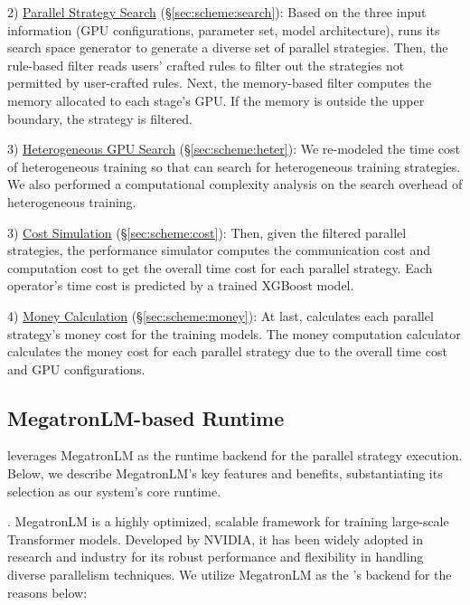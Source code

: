 2) \underline{Parallel Strategy Search} (\S\ref{sec:scheme:search}): Based on the three input information (GPU configurations, parameter set, model architecture), \sysname runs its search space generator to generate a diverse set of parallel strategies.
Then, the rule-based filter reads users' crafted rules to filter out the strategies not permitted by user-crafted rules.
Next, the memory-based filter computes the memory allocated to each stage's GPU. If the memory is outside the upper boundary, the strategy is filtered.

3) \underline{Heterogeneous GPU Search} (\S\ref{sec:scheme:heter}):
We re-modeled the time cost of heterogeneous training so that \sysname can search for heterogeneous training strategies. We also performed a computational complexity analysis on the search overhead of heterogeneous training.

3) \underline{Cost Simulation} (\S\ref{sec:scheme:cost}): Then, given the filtered parallel strategies, the performance simulator computes the communication cost and computation cost to get the overall time cost for each parallel strategy.
Each operator's time cost is predicted by a trained XGBoost model.

4) \underline{Money Calculation} (\S\ref{sec:scheme:money}): At last, \sysname calculates each parallel strategy's money cost for the training models.
The money computation calculator calculates the money cost for each parallel strategy due to the overall time cost and GPU configurations.


\subsection{MegatronLM-based Runtime}\label{sec:scheme:runtime}

\sysname leverages MegatronLM as the runtime backend for the parallel strategy execution.
Below, we describe MegatronLM's key features and benefits, substantiating its selection as our system's core runtime.

. MegatronLM is a highly optimized, scalable framework for training large-scale Transformer models. Developed by NVIDIA, it has been widely adopted in research and industry for its robust performance and flexibility in handling diverse parallelism techniques. 
We utilize MegatronLM as the \sysname's backend for the reasons below:

